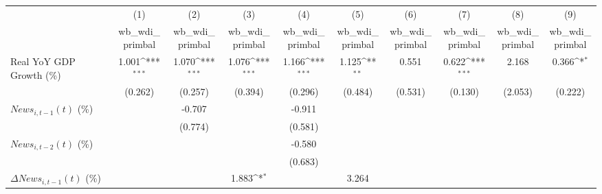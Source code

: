{
\def\sym#1{\ifmmode^{#1}\else\(^{#1}\)\fi}
\begin{tabular}{l*{9}{c}}
\toprule
                    &\multicolumn{1}{c}{(1)}&\multicolumn{1}{c}{(2)}&\multicolumn{1}{c}{(3)}&\multicolumn{1}{c}{(4)}&\multicolumn{1}{c}{(5)}&\multicolumn{1}{c}{(6)}&\multicolumn{1}{c}{(7)}&\multicolumn{1}{c}{(8)}&\multicolumn{1}{c}{(9)}\\
                    &\multicolumn{1}{c}{wb_wdi_primbal}&\multicolumn{1}{c}{wb_wdi_primbal}&\multicolumn{1}{c}{wb_wdi_primbal}&\multicolumn{1}{c}{wb_wdi_primbal}&\multicolumn{1}{c}{wb_wdi_primbal}&\multicolumn{1}{c}{wb_wdi_primbal}&\multicolumn{1}{c}{wb_wdi_primbal}&\multicolumn{1}{c}{wb_wdi_primbal}&\multicolumn{1}{c}{wb_wdi_primbal}\\
\midrule
Real YoY GDP Growth (\%)&       1.001\sym{***}&       1.070\sym{***}&       1.076\sym{***}&       1.166\sym{***}&       1.125\sym{**} &       0.551         &       0.622\sym{***}&       2.168         &       0.366\sym{*}  \\
                    &     (0.262)         &     (0.257)         &     (0.394)         &     (0.296)         &     (0.484)         &     (0.531)         &     (0.130)         &     (2.053)         &     (0.222)         \\
\addlinespace
$ News_{i,t-1}(t)$ (\%)&                     &      -0.707         &                     &      -0.911         &                     &                     &                     &                     &                     \\
                    &                     &     (0.774)         &                     &     (0.581)         &                     &                     &                     &                     &                     \\
\addlinespace
$ News_{i,t-2}(t)$ (\%)&                     &                     &                     &      -0.580         &                     &                     &                     &                     &                     \\
                    &                     &                     &                     &     (0.683)         &                     &                     &                     &                     &                     \\
\addlinespace
$ \Delta News_{i,t-1}(t)$ (\%)&                     &                     &       1.883\sym{*}  &                     &       3.264         &                     &                     &                     &                     \\

\end{tabular}}

